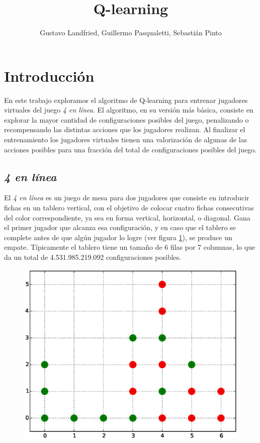 \documentclass[11pt, spanish]{article}
\title{Q-learning}
\author{Gustavo Landfried, Guillermo Pasqualetti, Sebastián Pinto}
\begin{document}

\maketitle

\section{Introducción}
\par En este trabajo exploramos el algoritmo de Q-learning para entrenar 
jugadores virtuales del juego \emph{4 en línea}. El algoritmo, en su versión 
más básica, consiste en explorar la mayor cantidad de configuraciones 
posibles del juego, penalizando o recompensando las distintas acciones 
que los jugadores realizan. Al finalizar el 
entrenamiento los jugadores virtuales tienen una valorización de algunas de las 
acciones posibles para una fracción del total de configuraciones posibles del 
juego. 

\subsection{\emph{4 en línea}}

\par El \emph{4 en línea} es un juego de mesa para dos jugadores que consiste 
en introducir fichas en un tablero vertical, con el objetivo de colocar cuatro 
fichas consecutivas del color correspondiente, ya sea en forma vertical, 
horizontal, o diagonal. Gana el primer jugador que alcanza esa configuración, y 
en caso que el tablero se complete antes de que algún jugador lo logre 
(ver figura \ref{fig:tablero}), se produce un empate. 
Típicamente el tablero tiene un tamaño de 6 filas por 7 columnas, lo que da un 
total de 4.531.985.219.092 configuraciones posibles.
\begin{figure}
\centering
\includegraphics[scale = 0.5]{figuras/Tablero.eps}
\label{fig:tablero}
\end{figure}
\end{document}
